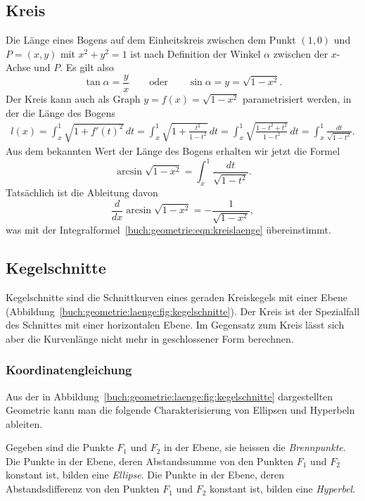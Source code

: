 \subsection{Kreis}
Die Länge eines Bogens auf dem Einheitskreis zwischen dem Punkt
$(1,0)$ und $P=(x,y)$ mit $x^2+y^2=1$ ist nach Definition der
Winkel $\alpha$ zwischen der $x$-Achse und $P$.
Es gilt also
\[
\tan\alpha = \frac{y}{x}
\qquad\text{oder}\qquad
\sin\alpha = y = \sqrt{1-x^2}.
\]
Der Kreis kann auch als Graph $y=f(x)=\sqrt{1-x^2}$ parametrisiert werden,
in der die Länge des Bogens 
\begin{align*}
l(x)
=
\int_x^1 \sqrt{1+f'(t)^2}\,dt
=
\int_x^1 \sqrt{1+\frac{t^2}{1-t^2}}\,dt
=
\int_x^1 \sqrt{\frac{1-t^2+t^2}{1-t^2}}\,dt
=
\int_x^1 \frac{dt}{\sqrt{1-t^2}}.
\end{align*}
Aus dem bekannten Wert der Länge des Bogens erhalten wir jetzt die
Formel
\begin{equation}
\arcsin \sqrt{1-x^2} = \int_x^1 \frac{dt}{\sqrt{1-t^2}}.
\label{buch:geometrie:eqn:kreislaenge} 
\end{equation}
Tatsächlich ist die Ableitung davon
\[
\frac{d}{dx}\arcsin\sqrt{1-x^2}
=
-\frac{1}{\sqrt{1-x^2}},
\]
was mit der Integralformel~\eqref{buch:geometrie:eqn:kreislaenge} 
übereinstimmt.

%
%
\subsection{Kegelschnitte
\label{buch:geometrie:subsection:kegelschnitte}}
Kegelschnitte sind die Schnittkurven eines geraden Kreiskegels
mit einer Ebene (Abbildung~\ref{buch:geometrie:laenge:fig:kegelschnitte}).
Der Kreis ist der Spezialfall des Schnittes mit einer horizontalen
Ebene.
Im Gegensatz zum Kreis lässt sich aber die Kurvenlänge nicht mehr
in geschlossener Form berechnen.

%
%
\subsubsection{Koordinatengleichung}
Aus der in Abbildung~\ref{buch:geometrie:laenge:fig:kegelschnitte}
dargestellten Geometrie kann man die folgende Charakterisierung von
Ellipsen und Hyperbeln ableiten.

\begin{definition}
\label{buch:geometrie:def:kegelschnitte}
Gegeben sind die Punkte $F_1$ und $F_2$ in der Ebene, sie heissen
die {\em Brennpunkte}.
Die Punkte in der Ebene, deren Abstandssumme von den Punkten $F_1$
und $F_2$ konstant ist, bilden eine {\em Ellipse}.
Die Punkte in der Ebene, deren Abstandsdifferenz von den Punkten
$F_1$ und $F_2$ konstant ist, bilden eine {\em Hyperbel}.
\end{definition}

